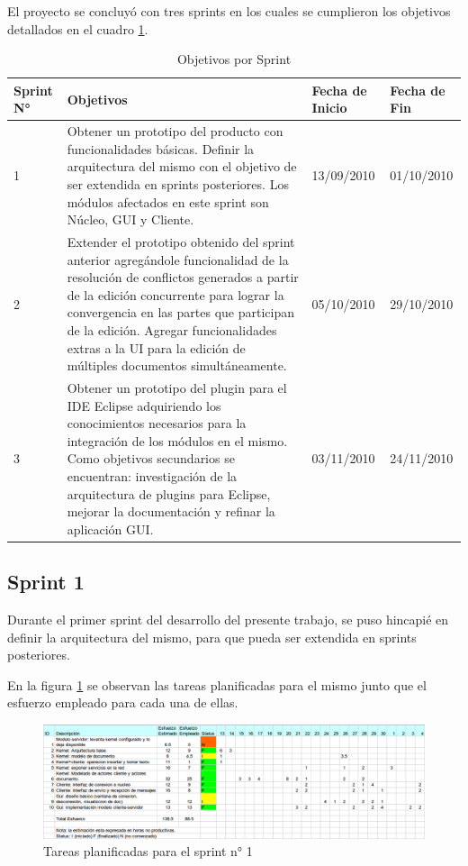 \documentclass[12pt,a4paper]{article}
\begin{document}
El proyecto se concluyó con tres sprints en los cuales se cumplieron los objetivos detallados en el cuadro \ref{objetivos_por_sprint}.

\begin{table}
    \begin{tabular}{ | l | p{6.5cm} | p{2cm} | p{2cm} | }
    \hline
	Sprint N° & Objetivos & Fecha de Inicio & Fecha de Fin \\ \hline

	1 & Obtener un prototipo del producto con funcionalidades básicas. Definir la arquitectura del mismo con el
	objetivo de ser extendida en sprints posteriores. Los módulos afectados en este sprint son Núcleo, GUI y Cliente.
	& 13/09/2010 & 01/10/2010 \\ \hline

	2 & Extender el prototipo obtenido del sprint anterior agregándole funcionalidad de la resolución de conflictos
	generados a partir de la edición concurrente para lograr la convergencia en las partes que participan de la edición.
	Agregar funcionalidades extras a la UI para la edición de múltiples documentos simultáneamente.
	& 05/10/2010 & 29/10/2010 \\ \hline

	3 & Obtener un prototipo del plugin para el IDE Eclipse adquiriendo los conocimientos necesarios para la integración de los
	módulos en el mismo. Como objetivos secundarios se encuentran: investigación de la arquitectura de plugins para Eclipse, mejorar
	la documentación y refinar la aplicación GUI.
	& 03/11/2010 & 24/11/2010 \\ \hline

    \end{tabular}
    \caption{\label{objetivos_por_sprint} Objetivos por Sprint}
\end{table}

\subsection{Sprint 1}

Durante el primer sprint del desarrollo del presente trabajo, se puso hincapié en definir la arquitectura del mismo,
para que pueda ser extendida en sprints posteriores.

En la figura \ref{sprint1-tareas} se observan las tareas planificadas para el mismo junto que el esfuerzo empleado para
cada una de ellas.

	\begin{figure}[!ht]
		\begin{center}
			\includegraphics[width=14cm]{sprint1.png}
			\caption{\label{sprint1-tareas} Tareas planificadas para el sprint n° 1 }
		\end{center}
	\end{figure}
\end{document}
